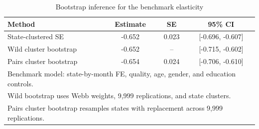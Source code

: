 \begin{table}[H]
\centering
\caption{Bootstrap inference for the benchmark elasticity}
\label{tab:bootstrap-inference}
\centering
\begin{tabular}[t]{lccc}
\toprule
Method & Estimate & SE & 95\% CI\\
\midrule
State-clustered SE & -0.652 & 0.023 & [-0.696, -0.607]\\
Wild cluster bootstrap & -0.652 & -- & [-0.715, -0.602]\\
Pairs cluster bootstrap & -0.654 & 0.024 & [-0.706, -0.610]\\
\bottomrule
\multicolumn{4}{l}{\rule{0pt}{1em}Benchmark model: state-by-month FE, quality, age, gender, and education controls.}\\
\multicolumn{4}{l}{\rule{0pt}{1em}Wild bootstrap uses Webb weights, 9,999 replications, and state clusters.}\\
\multicolumn{4}{l}{\rule{0pt}{1em}Pairs cluster bootstrap resamples states with replacement across 9,999 replications.}\\
\end{tabular}
\end{table}
